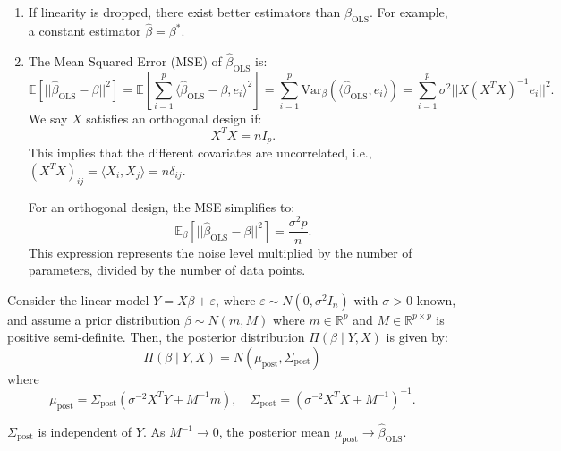 \documentclass[open=any, 11pt,paper=A4]{scrreprt}
\begin{document}
\begin{remark}
\begin{enumerate}
    \item If linearity is dropped, there exist better estimators than $\hat{\beta}_{\text{OLS}}$. For example, a constant estimator $\hat{\beta} = \beta^*$.
    \item The Mean Squared Error (MSE) of $\hat{\beta}_{\text{OLS}}$ is:
    \[
    \mathbb{E}\left[ ||\hat{\beta}_{\text{OLS}} - \beta||^2 \right] = \mathbb{E}\left[ \sum_{i=1}^{p} \langle \hat{\beta}_{\text{OLS}} - \beta, e_i \rangle^2 \right] = \sum_{i=1}^{p} \text{Var}_\beta\left( \langle \hat{\beta}_{\text{OLS}}, e_i \rangle \right) = \sum_{i=1}^{p} \sigma^2 ||X(X^T X)^{-1} e_i||^2.
    \]
    We say $X$ satisfies an orthogonal design if:
    \[
    X^T X = nI_p.
    \]
    This implies that the different covariates are uncorrelated, i.e., $(X^T X)_{ij} = \langle X_i, X_j \rangle = n \delta_{ij}$.
    
    For an orthogonal design, the MSE simplifies to:
    \[
    \mathbb{E}_\beta\left[ ||\hat{\beta}_{\text{OLS}} - \beta||^2 \right] = \frac{\sigma^2 p}{n}.
    \]
    This expression represents the noise level multiplied by the number of parameters, divided by the number of data points.
\end{enumerate}
\end{remark}

\begin{theorem}
Consider the linear model $Y = X\beta + \varepsilon$, where $\varepsilon \sim N(0, \sigma^2 I_n)$ with $\sigma > 0$ known, and assume a prior distribution $\beta \sim N(m, M)$ where $m \in \mathbb{R}^{p}$ and $M \in \mathbb{R}^{p \times p}$ is positive semi-definite. Then, the posterior distribution $\Pi(\beta \mid Y, X)$ is given by:
\[
\Pi(\beta \mid Y, X) = N(\mu_{\text{post}}, \Sigma_{\text{post}})
\]
where
\[
\mu_{\text{post}} = \Sigma_{\text{post}} \left( \sigma^{-2} X^T Y + M^{-1} m \right), \quad \Sigma_{\text{post}} = \left( \sigma^{-2} X^T X + M^{-1} \right)^{-1}.
\]
\end{theorem}

\begin{remark}
$\Sigma_{\text{post}}$ is independent of $Y$. As $M^{-1} \to 0$, the posterior mean $\mu_{\text{post}} \to \hat{\beta}_{\text{OLS}}$.
\end{remark}
\end{document}
